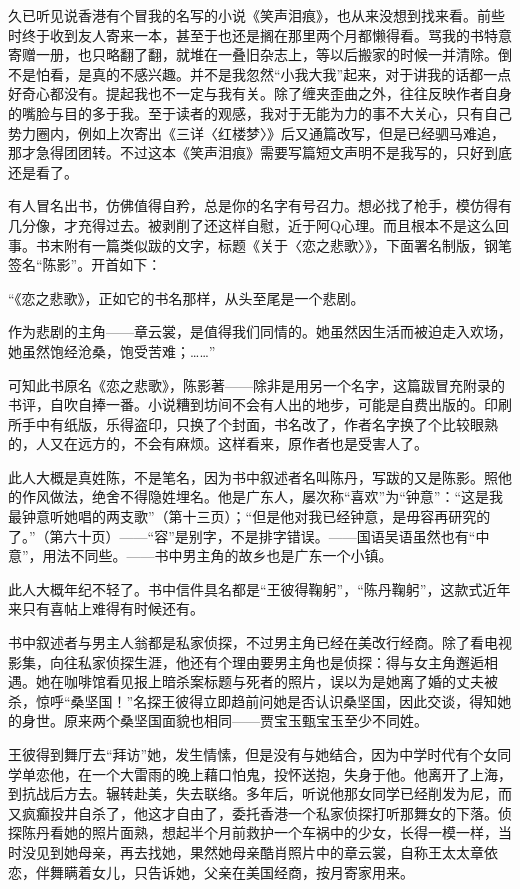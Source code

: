 \par 久已听见说香港有个冒我的名写的小说《笑声泪痕》，也从来没想到找来看。前些时终于收到友人寄来一本，甚至于也还是搁在那里两个月都懒得看。骂我的书特意寄赠一册，也只略翻了翻，就堆在一叠旧杂志上，等以后搬家的时候一并清除。倒不是怕看，是真的不感兴趣。并不是我忽然“小我大我”起来，对于讲我的话都一点好奇心都没有。提起我也不一定与我有关。除了缠夹歪曲之外，往往反映作者自身的嘴脸与目的多于我。至于读者的观感，我对于无能为力的事不大关心，只有自己势力圈内，例如上次寄出《三详〈红楼梦〉》后又通篇改写，但是已经驷马难追，那才急得团团转。不过这本《笑声泪痕》需要写篇短文声明不是我写的，只好到底还是看了。
\par 有人冒名出书，仿佛值得自矜，总是你的名字有号召力。想必找了枪手，模仿得有几分像，才充得过去。被剥削了还这样自慰，近于阿Q心理。而且根本不是这么回事。书末附有一篇类似跋的文字，标题《关于〈恋之悲歌〉》，下面署名制版，钢笔签名“陈影”。开首如下：
\par “《恋之悲歌》，正如它的书名那样，从头至尾是一个悲剧。
\par 作为悲剧的主角——章云裳，是值得我们同情的。她虽然因生活而被迫走入欢场，她虽然饱经沧桑，饱受苦难；……”
\par 可知此书原名《恋之悲歌》，陈影著——除非是用另一个名字，这篇跋冒充附录的书评，自吹自捧一番。小说糟到坊间不会有人出的地步，可能是自费出版的。印刷所手中有纸版，乐得盗印，只换了个封面，书名改了，作者名字换了个比较眼熟的，人又在远方的，不会有麻烦。这样看来，原作者也是受害人了。
\par 此人大概是真姓陈，不是笔名，因为书中叙述者名叫陈丹，写跋的又是陈影。照他的作风做法，绝舍不得隐姓埋名。他是广东人，屡次称“喜欢”为“钟意”：“这是我最钟意听她唱的两支歌”（第十三页）；“但是他对我已经钟意，是毋容再研究的了。”（第六十页）——“容”是别字，不是排字错误。——国语吴语虽然也有“中意”，用法不同些。——书中男主角的故乡也是广东一个小镇。
\par 此人大概年纪不轻了。书中信件具名都是“王彼得鞠躬”，“陈丹鞠躬”，这款式近年来只有喜帖上难得有时候还有。
\par 书中叙述者与男主人翁都是私家侦探，不过男主角已经在美改行经商。除了看电视影集，向往私家侦探生涯，他还有个理由要男主角也是侦探：得与女主角邂逅相遇。她在咖啡馆看见报上暗杀案标题与死者的照片，误以为是她离了婚的丈夫被杀，惊呼“桑坚国！”名探王彼得立即趋前问她是否认识桑坚国，因此交谈，得知她的身世。原来两个桑坚国面貌也相同——贾宝玉甄宝玉至少不同姓。
\par 王彼得到舞厅去“拜访”她，发生情愫，但是没有与她结合，因为中学时代有个女同学单恋他，在一个大雷雨的晚上藉口怕鬼，投怀送抱，失身于他。他离开了上海，到抗战后方去。辗转赴美，失去联络。多年后，听说他那女同学已经削发为尼，而又疯癫投井自杀了，他这才自由了，委托香港一个私家侦探打听那舞女的下落。侦探陈丹看她的照片面熟，想起半个月前救护一个车祸中的少女，长得一模一样，当时没见到她母亲，再去找她，果然她母亲酷肖照片中的章云裳，自称王太太章依恋，伴舞瞒着女儿，只告诉她，父亲在美国经商，按月寄家用来。
